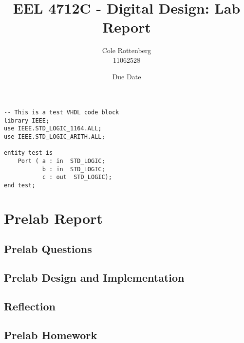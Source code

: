 \documentclass{article}
\title{EEL 4712C - Digital Design: Lab Report}
\author{Cole Rottenberg \\ 11062528}
\date{Due Date}
\begin{document}
\maketitle

\begin{lstlisting}[caption=Test VHDL Code, label=lst:test-vhdl-code]
-- This is a test VHDL code block
library IEEE;
use IEEE.STD_LOGIC_1164.ALL;
use IEEE.STD_LOGIC_ARITH.ALL;

entity test is
    Port ( a : in  STD_LOGIC;
           b : in  STD_LOGIC;
           c : out  STD_LOGIC);
end test;
\end{lstlisting}

\section*{Prelab Report}

\subsection*{Prelab Questions}

\subsection*{Prelab Design and Implementation}

\subsection*{Reflection}

\subsection*{Prelab Homework}
\end{document}
